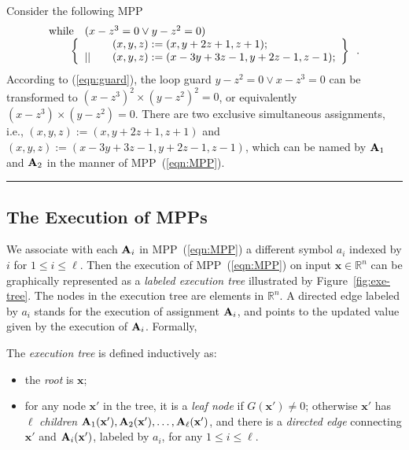 \documentclass{jssc}
\newcommand{\rulex}{\hfill\rule{1mm}{3mm}}
\newcommand{\while}{{\rm while}}
\newcommand{\xx}{\mathbf{x}}
\begin{document}
\begin{example}
Consider the following MPP
\[
\begin{array}{l}
\while \quad (x-z^3=0 \vee y-z^2=0) \\
\qquad \left\{
\begin{array}{ll}
 & \quad (x,y,z) := (x,y+2z+1,z+1); \\
|| & \quad (x,y,z) := (x-3y+3z-1,y+2z-1,z-1); \\
\end{array}
\right\} \enspace  .\\
\end{array}
\]
According to (\ref{eqn:guard}), the loop guard $y-z^2=0 \vee x-z^3=0$ can be transformed to $(x-z^3)^2 \times (y-z^2)^2=0$, or equivalently $(x-z^3) \times (y-z^2)=0$. There are two exclusive simultaneous assignments, i.e., $(x,y,z):=(x,y+2z+1,z+1)$ and $(x,y,z):=(x-3y+3z-1,y+2z-1,z-1)$, which can be named by ${\bf A}_1$ and ${\bf A}_2$ in the manner of MPP~(\ref{eqn:MPP}). \rulex
\end{example}

\subsection{The Execution of MPPs}
We associate with each ${\bf A}_i$ in MPP~(\ref{eqn:MPP}) a different symbol $a_i$ indexed by $i$ for $1 \leq i \leq \ell$. Then the execution of MPP~(\ref{eqn:MPP}) on input $\xx \in \mathbb{R}^n$ can be graphically represented as a \emph{labeled execution tree} illustrated by Figure~\ref{fig:exe-tree}. The nodes in the execution tree are elements in $\mathbb{R}^n$. A directed edge labeled by $a_i$ stands for the execution of assignment ${\bf A}_i$, and points to the updated value given by the execution of ${\bf A}_i$. Formally,
\begin{definition}
The \emph{execution tree} is defined inductively as:
\begin{itemize}
\item the \emph{root} is $\xx$;
\item for any node $\xx'$ in the tree, it is a \emph{leaf node} if $G(\xx') \neq 0$; otherwise $\xx'$ has $\ell$ \emph{children} ${\bf A}_1(\xx'), {\bf A}_2(\xx'), \ldots, {\bf A}_{\ell}(\xx')$, and there is a \emph{directed edge} connecting $\xx'$ and ${\bf A}_i(\xx')$, labeled by $a_i$, for any $1 \leq i \leq \ell$.
\end{itemize}
\end{definition}
\end{document}

